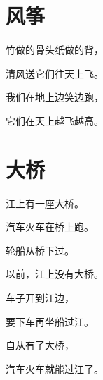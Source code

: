 \documentclass[12pt,UTF-8,openany]{ctexbook}
\begin{document}
\chapter{风筝}

\begin{large}
    
    竹做的骨头纸做的背，
    
    清风送它们往天上飞。
    
    我们在地上边笑边跑，
    
    它们在天上越飞越高。
    
\end{large}


\clearpage

\begin{center}
    
    
    
\end{center}


\hanzibox{}\hanzibox{}\hanzibox{}\hanzibox{}\hspace{1em}\hanzibox{}\hanzibox{}\hanzibox{}\hanzibox{}

\hanzibox{}\hanzibox{}\hanzibox{}\hanzibox{}\hspace{1em}\hanzibox{}\hanzibox{}\hanzibox{}\hanzibox{}

\hanzibox{}\hanzibox{}\hanzibox{}\hanzibox{}\hspace{1em}\hanzibox{}\hanzibox{}\hanzibox{}\hanzibox{}

\hanzibox{}\hanzibox{}\hanzibox{}\hanzibox{}\hspace{1em}\hanzibox{}\hanzibox{}\hanzibox{}\hanzibox{}






\chapter{大桥}

\begin{large}
    
    江上有一座大桥。
    
    汽车火车在桥上跑。
    
    轮船从桥下过。
    
    以前，江上没有大桥。
    
    车子开到江边，
    
    要下车再坐船过江。
    
    自从有了大桥，
    
    汽车火车就能过江了。
    
\end{large}
\end{document}
